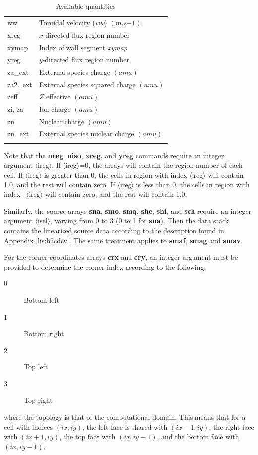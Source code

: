 \documentclass[a4paper,10pt]{report}
\begin{document}
\begin{center}
\begin{longtable}{|l|l|}
    ww       & \index{b2plot, ww} Toroidal velocity ({\em ww}) $(m.s{-1})$ \\
    xreg     & \index{b2plot, xreg} $x$-directed flux region number \\
    xymap    & \index{b2plot, xymap} Index of wall segment {\em xymap} \\
    yreg     & \index{b2plot, yreg} $y$-directed flux region number \\
    za\_ext  & \index{b2plot, za\_ext} External species charge $(amu)$ \\
    za2\_ext & \index{b2plot, za2\_ext} External species squared charge $(amu)$ \\
    zeff     & \index{b2plot, zeff} $Z$ effective $(amu)$ \\
    zi, za   & \index{b2plot, zi} Ion charge $(amu)$ \index{b2plot, za} \\
    zn       & \index{b2plot, zn} Nuclear charge $(amu)$ \\
    zn\_ext  & \index{b2plot, zn\_ext} External species nuclear charge $(amu)$ \\
    \hline
    \caption{Available quantities}
    \label{tab:available-quantities}
  \end{longtable}
\end{center}

Note that the {\bf nreg}, {\bf niso}, {\bf xreg}, and {\bf yreg} commands require an integer
argument $\langle$ireg$\rangle$. If $\langle$ireg$\rangle$=0, the arrays will contain the region
number of each cell. If $\langle$ireg$\rangle$ is greater than 0, the cells in region with index $\langle$ireg$\rangle$ will contain 1.0, and the rest will contain zero. If $\langle$ireg$\rangle$ is less than 0, the cells in region with index --$\langle$ireg$\rangle$ will contain zero, and the rest will contain 1.0.

Similarly, the source arrays {\bf sna}, {\bf smo}, {\bf smq}, {\bf she}, {\bf shi}, and
{\bf sch} require an integer argument $\langle$isel$\rangle$, varying from 0 to 3 (0 to 1 for {\bf sna}). Then the data
stack contains the linearized source data according to the description found in Appendix \ref{lis:b2cdcv}.
The same treatment applies to {\bf smaf}, {\bf smag} and {\bf smav}.

For the corner coordinates arrays {\bf crx} and {\bf cry}, an integer argument must be provided to determine the corner
index according to the following:
\begin{description}
  \item[0] Bottom left
  \item[1] Bottom right
  \item[2] Top left
  \item[3] Top right
\end{description}
where the topology is that of the computational domain. This means that for a cell with indices $(ix,iy)$,
the left face is shared with $(ix-1,iy)$, the right face with $(ix+1,iy)$, the top face with $(ix,iy+1)$,
and the bottom face with $(ix,iy-1)$.
\end{document}
